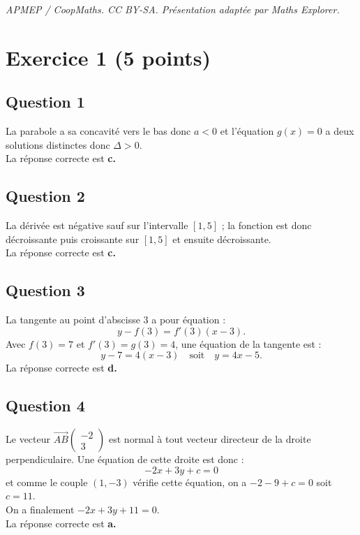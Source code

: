 \documentclass[10pt]{article}
\begin{document}
\noindent\textit{APMEP / CoopMaths. CC BY-SA. Présentation adaptée par Maths Explorer.}\par\medskip
\section*{Exercice 1 (5 points)}
	
	\subsection*{Question 1}
La parabole a sa concavité vers le bas donc \(a < 0\) et l’équation \(g(x) = 0\) a deux solutions distinctes donc \(\Delta > 0\). \\
La réponse correcte est \textbf{c.}
	
	\subsection*{Question 2}
	
La dérivée est négative sauf sur l’intervalle \([1, 5]\) ; la fonction est donc décroissante puis croissante sur \([1, 5]\) et ensuite décroissante.\\
 La réponse correcte est \textbf{c.}
	
	\subsection*{Question 3}
	
La tangente au point d’abscisse 3 a pour équation :
\[ y - f(3) = f'(3)(x - 3). \]
Avec \(f(3) = 7\) et \(f'(3) = g(3) = 4\), une équation de la tangente est :
\[ y - 7 = 4(x - 3) \quad \text{soit} \quad y = 4x - 5. \]
La réponse correcte est \textbf{d.}
	
	\subsection*{Question 4}
	
Le vecteur \(\overrightarrow{AB} \left( \begin{array}{c} -2 \\ 3 \end{array} \right)\) est normal à tout vecteur directeur de la droite perpendiculaire. Une équation de cette droite est donc :
\[-2x + 3y + c = 0 \]
et comme le couple \((1, -3)\) vérifie cette équation, on a \(-2 - 9 + c = 0\) soit \(c = 11\).\\
 On a finalement \(-2x + 3y + 11 = 0\).\\
  La réponse correcte est \textbf{a.}
	
\end{document}
